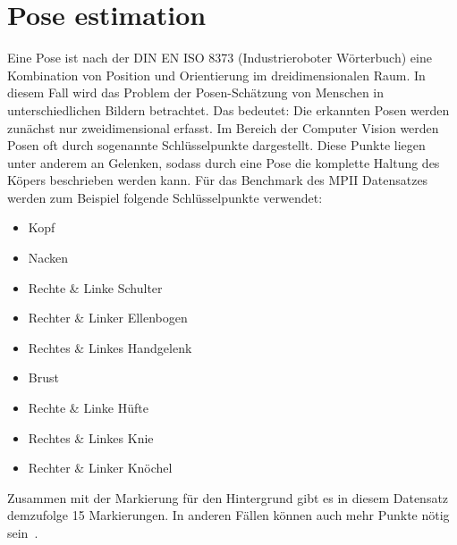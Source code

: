 \documentclass[journal, a4paper]{IEEEtran}
\begin{document}
\section{Pose estimation} \label{sec:pose_estimation}
	Eine Pose ist nach der DIN EN ISO 8373 (Industrieroboter Wörterbuch) eine Kombination von Position und Orientierung im dreidimensionalen Raum. In diesem Fall wird das Problem der Posen-Schätzung von Menschen in unterschiedlichen Bildern betrachtet. Das bedeutet: Die erkannten Posen werden zunächst nur zweidimensional erfasst. Im Bereich der Computer Vision werden Posen oft durch sogenannte Schlüsselpunkte dargestellt. Diese Punkte liegen unter anderem an Gelenken, sodass durch eine Pose die komplette Haltung des Köpers beschrieben werden kann.
        Für das Benchmark des MPII Datensatzes~\cite{MPII} 
        werden zum Beispiel folgende Schlüsselpunkte verwendet:
        \begin{itemize}
        \item Kopf 
        \item Nacken
        \item Rechte \& Linke Schulter
        \item Rechter \& Linker Ellenbogen
        \item Rechtes \& Linkes Handgelenk
        \item Brust
        \item Rechte \& Linke Hüfte
        \item Rechtes \& Linkes Knie
        \item Rechter \& Linker Knöchel
        \end{itemize}
        Zusammen mit der Markierung für den Hintergrund gibt es in diesem Datensatz demzufolge 15 Markierungen. In anderen Fällen können auch mehr Punkte nötig sein~\cite{lin2014microsoft}.
\end{document}
